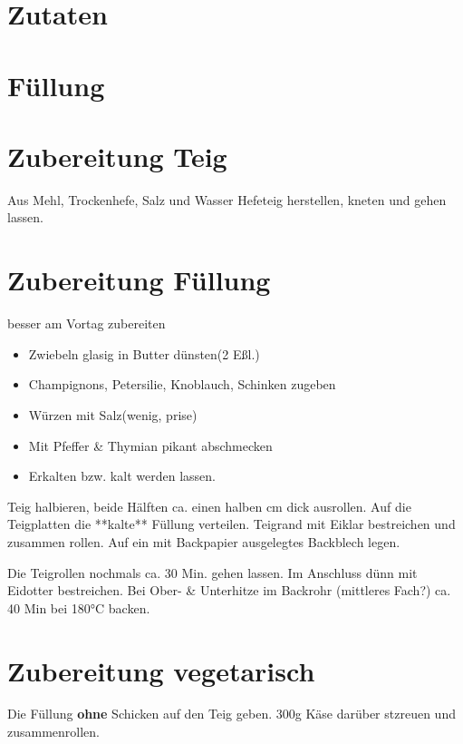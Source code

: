 \section{Zutaten}


\section{Füllung}


\section{Zubereitung Teig}
Aus Mehl, Trockenhefe,
Salz und Wasser Hefeteig herstellen,
kneten und gehen lassen.

\section{Zubereitung Füllung}
besser am Vortag zubereiten

\begin{itemize}
	\item Zwiebeln glasig in Butter dünsten(2 Eßl.)
	\item Champignons, Petersilie, Knoblauch, Schinken zugeben
	\item Würzen mit Salz(wenig, prise)
	\item Mit Pfeffer \& Thymian pikant abschmecken
	\item Erkalten bzw. kalt werden lassen.
\end{itemize}

Teig halbieren, beide Hälften ca. einen halben cm dick ausrollen.
Auf die Teigplatten die **kalte** Füllung verteilen.
Teigrand mit Eiklar bestreichen und zusammen rollen.
Auf ein mit Backpapier ausgelegtes Backblech legen.

\begin{flushleft}
	Die Teigrollen nochmals ca. 30 Min. gehen lassen.
	Im Anschluss dünn mit Eidotter bestreichen.
	Bei Ober-  \& Unterhitze im Backrohr (mittleres Fach?)
	ca. 40 Min bei 180°C backen.
\end{flushleft}

\section{Zubereitung vegetarisch}
Die Füllung  \textbf{ohne} Schicken auf den Teig geben. 300g Käse
darüber stzreuen und zusammenrollen.